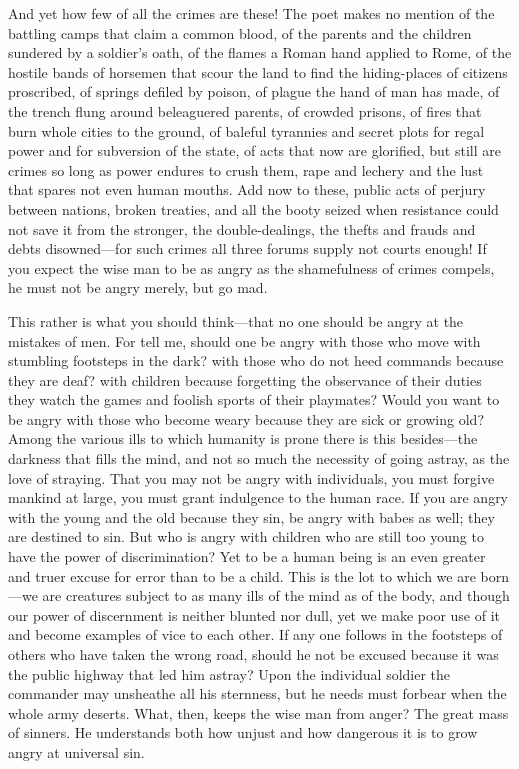 \noindent And yet how few of all the crimes are these! The poet makes
no mention of the battling camps that claim a common blood, of the
parents and the children sundered by a soldier's oath, of the flames a
Roman hand applied to Rome, of the hostile bands of horsemen that
scour the land to find the hiding-places of citizens proscribed, of
springs defiled by poison, of plague the hand of man has made, of the
trench flung around beleaguered parents, of crowded prisons, of
 fires that burn whole cities to the ground, of baleful
tyrannies and secret plots for regal power and for subversion of the
state, of acts that now are glorified, but still are crimes so long as
power endures to crush them, rape and lechery and the lust that spares
not even human mouths. Add now to these, public acts of perjury
between nations, broken treaties, and all the booty seized when
resistance could not save it from the stronger, the double-dealings,
the thefts and frauds and debts dis\-owned---for such crimes all three
forums supply not courts enough! If you expect the wise man to be as
angry as the shamefulness of crimes compels, he must not be angry
merely, but go mad.

This rather is what you should think---that no one should be angry at
the mistakes of men. For tell me, should one be angry with those who
move with stumbling footsteps in the dark? with those who do not heed
commands because they are deaf? with children because forgetting the
observance of their duties they watch the games and foolish sports of
their playmates? Would you want to be angry with those who become
weary because they are sick or growing old? Among the various ills to
which humanity is prone there is this be\-sides---the darkness that
fills the mind, and not so much the necessity of going astray, as the
love of straying. That you may not be angry with individuals, you must
forgive mankind at large, you must grant indulgence to the human race.
If you are angry with the young and the old because they sin, be angry
with babes as well; they are destined to sin. But who is angry with
children who are still too young to have the power of discrimination?
Yet to be a human being is an even  greater and truer excuse
for error than to be a child. This is the lot to which we are
born---we are creatures subject to as many ills of the mind as of the
body, and though our power of discernment is neither blunted nor dull,
yet we make poor use of it and become examples of vice to each other.
If any one follows in the footsteps of others who have taken the wrong
road, should he not be excused because it was the public highway that
led him astray? Upon the individual soldier the commander may
unsheathe all his sternness, but he needs must forbear when the whole
army deserts. What, then, keeps the wise man from anger? The great
mass of sinners. He understands both how unjust and how dangerous it
is to grow angry at universal sin.

